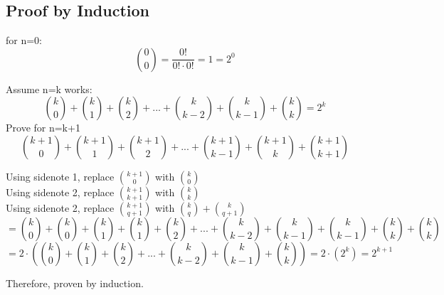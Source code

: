 \documentclass[a4paper]{article}
\begin{document}
\subsection{Proof by Induction}\label{pas:proof_by_induction} 

for n=0:
$${0 \choose 0} = \frac{0!}{0! \cdot 0!}=1=2^0$$

Assume n=k works:
$${k \choose 0} + {k \choose 1} +
{k \choose 2}+...+{k \choose k-2}+{k \choose k-1}+{k \choose k} =2^k$$
Prove for n=k+1
$${k+1 \choose 0} + {k+1 \choose 1} +
{k+1 \choose 2}+...+{k+1 \choose k-1}+{k+1 \choose k}+{k+1 \choose k+1}$$

Using sidenote 1, replace ${k+1 \choose 0}$ with ${k \choose 0}$\\

Using sidenote 2, replace ${k+1 \choose k+1}$ with ${k \choose k}$\\

Using sidenote 2, replace ${k+1 \choose q+1}$ with ${k \choose q} +{k \choose q+1}$\\

$$={k \choose 0} + {k \choose 0}+ {k \choose 1} + {k \choose 1}+ {k \choose 2}+...+{k \choose k-2}+{k \choose k-1}+{k \choose k-1}+{k \choose k}+{k \choose k}$$
$$=2 \cdot ({k \choose 0} + {k \choose 1} +
{k \choose 2}+...+{k \choose k-2}+{k \choose k-1}+{k \choose k}) =2 \cdot (2^k)= 2^{k+1}$$

Therefore, proven by induction.
\end{document}
